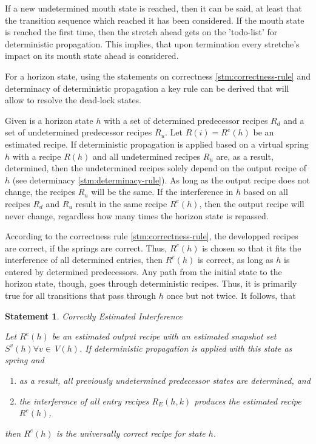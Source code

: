 \documentclass[12pt,a4paper]{scrartcl}
\newtheorem{statement}{Statement}
\begin{document}
If a new undetermined mouth state is reached, then it can be said, at least
that the transition sequence which reached it has been considered. If the mouth
state is reached the first time, then the stretch ahead gets on the 'todo-list'
for deterministic propagation. This implies, that upon termination every
stretche's impact on its mouth state ahead is considered.


For a horizon state, using the statements on correctness
\ref{stm:correctness-rule} and determinacy \label{stm:determinacy} of
deterministic propagation a key rule can be derived that will allow to resolve
the dead-lock states.

Given is a horizon state $h$ with a set of determined predecessor recipes $R_d$
and a set of undetermined predecessor recipes $R_u$. Let $R(i)=R^e(h)$ be an
estimated recipe. If deterministic propagation is applied based on a virtual
spring $h$ with a recipe $R(h)$ and all undetermined recipes $R_u$ are,
as a result, determined, then the undetermined recipes solely depend on the 
output recipe of $h$ (see determinacy \ref{stm:determinacy-rule}). As long
as the output recipe does not change, the recipes $R_u$ will be the same. 
If the interference in $h$ based on all recipes $R_d$ and $R_u$ result in the
same recipe $R^e(h)$, then the output recipe will never change, regardless how
many times the horizon state is repassed. 

According to the correctness rule \ref{stm:correctness-rule}, the developped
recipes are correct, if the springs are correct. Thus, $R^e(h)$ is chosen 
so that it fits the interference of all determined entries, then $R^e(h)$
is correct, as long as $h$ is entered by determined predecessors. Any path
from the initial state to the horizon state, though, goes through deterministic
recipes. Thus, it is primarily true for all transitions that pass through $h$
once but not twice. It follows, that

\begin{statement} Correctly Estimated Interference

    Let  $R^e(h)$ be an estimated output recipe with an estimated snapshot set
    $S^v(h)\forall v\in\,V(h)$. If deterministic propagation is applied with this
    state as spring and 

    \begin{enumerate}
        \item as a result, all previously undetermined predecessor states are
              determined, and
        \item the interference of all entry recipes $R_E(h,k)$ produces the 
              estimated recipe $R^e(h)$, 
    \end{enumerate}

    then $R^e(h)$ is the universally correct recipe for state $h$.
    
\end{statement}
\end{document}
